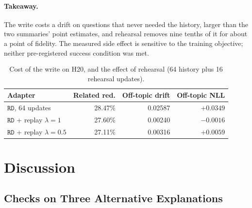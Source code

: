\documentclass[sigconf,nonacm]{acmart}
\newcommand{\armRD}{\texttt{RD}}
\begin{document}
\paragraph{Takeaway.} The write costs a drift on questions that never needed the history, larger than the two
summaries' point estimates, and rehearsal removes nine tenths of it for about a point of fidelity. The measured
side effect is sensitive to the training objective; neither pre-registered success condition was met.

\begin{table}[b]
\centering
\small
\setlength{\tabcolsep}{4pt}
\begin{tabular}{lrrr}
\toprule
Adapter & Related red. & Off-topic drift & Off-topic NLL \\
\midrule
$\armRD$, 64 updates & 28.47\% & 0.02587 & $+0.0349$ \\
$\armRD$ + replay $\lambda{=}1$ & 27.60\% & 0.00240 & $-0.0016$ \\
$\armRD$ + replay $\lambda{=}0.5$ & 27.11\% & 0.00316 & $+0.0059$ \\
\bottomrule
\end{tabular}
\caption{Cost of the write on H20, and the effect of rehearsal (64 history plus 16 rehearsal updates).}
\label{tab:replay}
\end{table}

\section{Discussion}

\subsection{Checks on Three Alternative Explanations}
\end{document}
